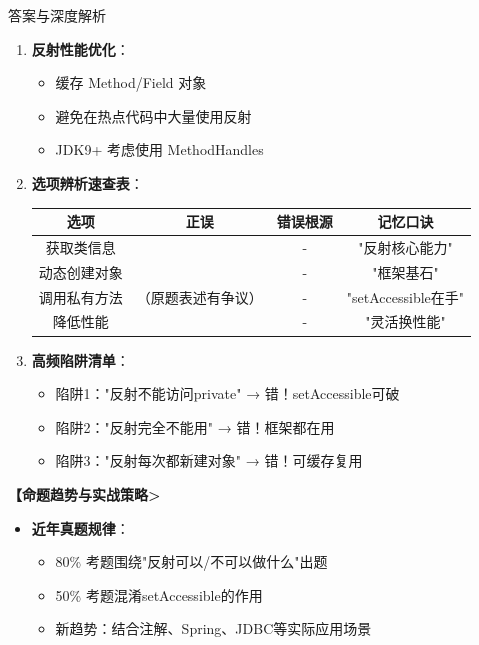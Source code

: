 \documentclass[12pt, a4paper]{ctexart}
\begin{document}
\begin{bluebox}{答案与深度解析}
\begin{itemize}[label={}, leftmargin=*, nosep]
\begin{enumerate}[leftmargin=*, nosep]
			      \item \textbf{反射性能优化}：
			            \begin{itemize}[label={}, nosep]
				            \item 缓存 Method/Field 对象
				            \item 避免在热点代码中大量使用反射
				            \item JDK9+ 考虑使用 MethodHandles
			            \end{itemize}

			      \item \textbf{选项辨析速查表}：
			            \begin{tabular}{|c|c|c|c|}
				            \hline
				            \textbf{选项} & \textbf{正误}         & \textbf{错误根源} & \textbf{记忆口诀}     \\
				            \hline
				            获取类信息       & \checkmark          & -             & "反射核心能力"          \\
				            \hline
				            动态创建对象      & \checkmark          & -             & "框架基石"            \\
				            \hline
				            调用私有方法      & \checkmark（原题表述有争议） & -             & "setAccessible在手" \\
				            \hline
				            降低性能        & \checkmark          & -             & "灵活换性能"           \\
				            \hline
			            \end{tabular}

			      \item \textbf{高频陷阱清单}：
			            \begin{itemize}[label={}, nosep]
				            \item 陷阱1："反射不能访问private" → 错！setAccessible可破
				            \item 陷阱2："反射完全不能用" → 错！框架都在用
				            \item 陷阱3："反射每次都新建对象" → 错！可缓存复用
			            \end{itemize}
		      \end{enumerate}

		      \textbf{【命题趋势与实战策略>}
		      \begin{itemize}[label={}, leftmargin=*, nosep]
			      \item \textbf{近年真题规律}：
			            \begin{itemize}[label={}, nosep]
				            \item 80\% 考题围绕"反射可以/不可以做什么"出题
				            \item 50\% 考题混淆setAccessible的作用
				            \item 新趋势：结合注解、Spring、JDBC等实际应用场景
			            \end{itemize}


\end{itemize}
\end{itemize}
\end{bluebox}
\end{document}
